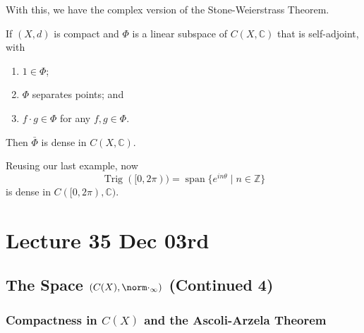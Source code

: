 \documentclass[notoc,notitlepage]{tufte-book}
\DeclareMathOperator{\Span}{span }
\DeclareMathOperator{\Trig}{Trig }
\begin{document}
With this, we have the complex version of the Stone-Weierstrass Theorem.

\begin{thm}\label{thm:stone_weierstrass_theorem_complex_version}
  If $(X, d)$ is compact and $\Phi$ is a linear subspace of $C(X, \mathbb{C})$ that is self-adjoint, with
  \begin{enumerate}
    \item $1 \in \Phi$;
    \item $\Phi$ separates points; and
    \item $f \cdot g \in \Phi$ for any $f, g \in \Phi$.
  \end{enumerate}
  Then $\bar{\Phi}$ is dense in $C(X, \mathbb{C})$.
\end{thm}

\begin{eg}
  Reusing our last example, now
  \begin{equation*}
    \Trig([0, 2 \pi)) = \Span \{ e^{i n \theta} \mid n \in \mathbb{Z} \}
  \end{equation*}
  is dense in $C([0, 2 \pi), \mathbb{C})$.
\end{eg}





\chapter{Lecture 35 Dec 03rd}%
\label{chp:lecture_35_dec_03rd}

\section{The Space $(C(X), \norm\cdot_\infty)$ (Continued 4)}%
\label{sec:the_space_c_x_normcdot_infty_continued_4}

\subsection{Compactness in $C(X)$ and the Ascoli-Arzela Theorem}%
\label{sub:compactness_in_c_x_and_the_ascoli_arzela_theorem}
\end{document}
